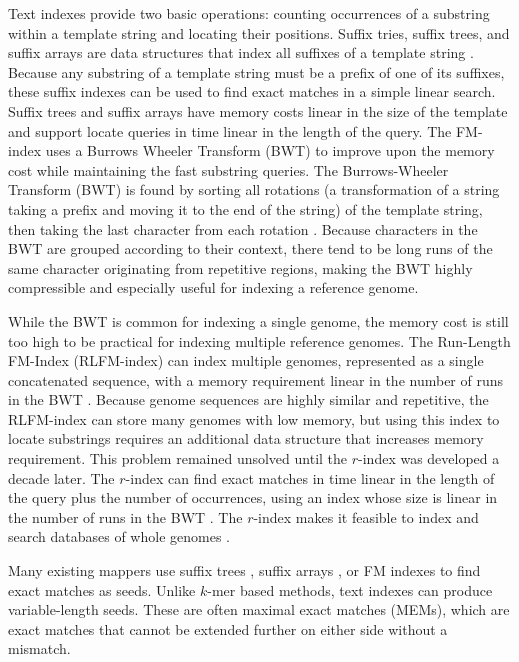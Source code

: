 \documentclass[11pt]{ucscthesis}
\begin{document}
Text indexes provide two basic operations: counting occurrences of a substring within a template string and locating their positions.
Suffix tries, suffix trees, and suffix arrays are data structures that index all suffixes of a template string \cite{li_survey_2010}.
Because any substring of a template string must be a prefix of one of its suffixes, these suffix indexes can be used to find exact matches in a simple linear search.
Suffix trees and suffix arrays have memory costs linear in the size of the template and support locate queries in time linear in the length of the query.
The FM-index uses a Burrows Wheeler Transform (BWT) to improve upon the memory cost while maintaining the fast substring queries.
The Burrows-Wheeler Transform (BWT) is found by sorting all rotations (a transformation of a string taking a prefix and moving it to the end of the string) of the template string, then taking the last character from each rotation \cite{burrows_wheeler_1994}.
Because characters in the BWT are grouped according to their context, there tend to be long runs of the same character originating from repetitive regions, making the BWT highly compressible and especially useful for indexing a reference genome.


While the BWT is common for indexing a single genome, the memory cost is still too high to be practical for indexing multiple reference genomes.
The Run-Length FM-Index (RLFM-index) can index multiple genomes, represented as a single concatenated sequence, with a memory requirement linear in the number of runs in the BWT \cite{makinen_succinct_2005,makinen_storage_2010}.
Because genome sequences are highly similar and repetitive, the RLFM-index can store many genomes with low memory, but using this index to locate substrings requires an additional data structure that increases memory requirement.
This problem remained unsolved until the $r$-index was developed a decade later.
The $r$-index can find exact matches in time linear in the length of the query plus the number of occurrences, using an index whose size is linear in the number of runs in the BWT \cite{gagie_rindex_2020}.
The $r$-index makes it feasible to index and search databases of whole genomes \cite{rossi_moni_2022}.

Many existing mappers use suffix trees \cite{kurtz_versatile_2004}, suffix arrays \cite{abouelhoda_replacing_2004,hoffmann_fast_2009}, or FM indexes \cite{langmead_bowtie2_2012,li_bwa_mem_2013,li_soap2_2009,li_bwa_2009,langmead_bowtie_2009} to find exact matches as seeds.
Unlike $k$-mer based methods, text indexes can produce variable-length seeds.
These are often maximal exact matches (MEMs), which are exact matches that cannot be extended further on either side without a mismatch.
\end{document}
